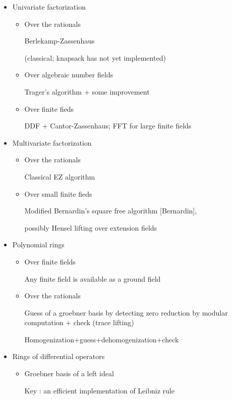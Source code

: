 \begin{slide}{}
\begin{itemize}
\item Univariate factorization

\begin{itemize}
\item Over the rationals

Berlekamp-Zassenhaus

(classical; knapsack has not yet implemented)

\item Over algebraic number fields

Trager's algorithm + some improvement

\item Over finite fieds

DDF + Cantor-Zassenhaus; FFT for large finite fields
\end{itemize}

\item Multivariate factorization

\begin{itemize}
\item Over the rationals

Classical EZ algorithm

\item Over small finite fieds

Modified Bernardin's square free algorithm [Bernardin],

possibly Hensel lifting over extension fields
\end{itemize}

\end{itemize}
\end{slide}

\begin{slide}{}
\begin{itemize}
\item Polynomial rings
\begin{itemize}
\item Over finite fields

Any finite field is available as a ground field

\item Over the rationals

Guess of a groebner basis by detecting zero reduction by modular computation
+ check (trace lifting)

Homogenization+guess+dehomogenization+check
\end{itemize}

\item Rings of differential operators

\begin{itemize}
\item Groebner basis of a left ideal

Key : an efficient implementation of Leibniz rule
\end{itemize}

\end{itemize}
\end{slide}

